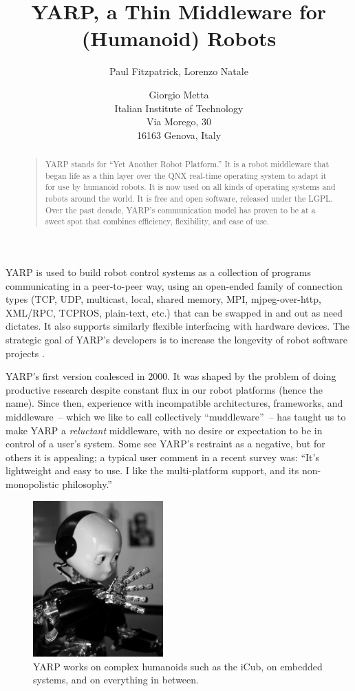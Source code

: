 \documentclass[letterpaper]{article}
\title{YARP, a Thin Middleware for (Humanoid) Robots}
\author{Paul Fitzpatrick{\rm ,}  Lorenzo Natale \and Giorgio Metta \\
Italian Institute of Technology \\
Via Morego, 30 \\16163 Genova, Italy}
\begin{document}
 
\maketitle
\begin{abstract}
\begin{quote}

YARP stands for ``Yet Another Robot Platform.''  It is a robot
middleware that began life as a thin layer over the QNX real-time
operating system to adapt it for use by humanoid robots.  It is now
used on all kinds of operating systems and robots around the world.
It is free and open software, released under the LGPL.  Over the past
decade, YARP's communication model has proven to be at a sweet spot
that combines efficiency, flexibility, and ease of use.

\end{quote}
\end{abstract}

\noindent 
YARP is used to build robot control systems as a collection of
programs communicating in a peer-to-peer way, using an open-ended
family of connection types (TCP, UDP, multicast, local, shared memory, 
MPI, mjpeg-over-http, XML/RPC, TCPROS, plain-text, etc.) that
can be swapped in and out
as need dictates.
It also supports similarly flexible interfacing
with hardware devices.  The strategic goal
of YARP's developers is to increase the longevity
of robot software projects \cite{fitzpatrick08towards}.

YARP's first version coalesced in 2000.  It was 
shaped by the problem of doing productive research despite constant flux
in our robot platforms (hence the name).  Since then, experience with
incompatible architectures, frameworks, and middleware~-- which we like
to call collectively ``muddleware''~-- has taught us to make YARP a {\it
  reluctant} middleware, with no desire or expectation to be in
control of a user's system.  Some see YARP's restraint as a
negative, but for others it is appealing; a typical user comment in a
recent survey was:  ``It's lightweight and easy to use. I like the
multi-platform support, and its non-monopolistic philosophy.''

\begin{figure}
\centerline{\includegraphics[width=5cm]{icub.jpg}}
\caption{YARP works on
complex humanoids such as the iCub, on embedded systems, and 
on everything in between.
} 
\end{figure}
\end{document}
